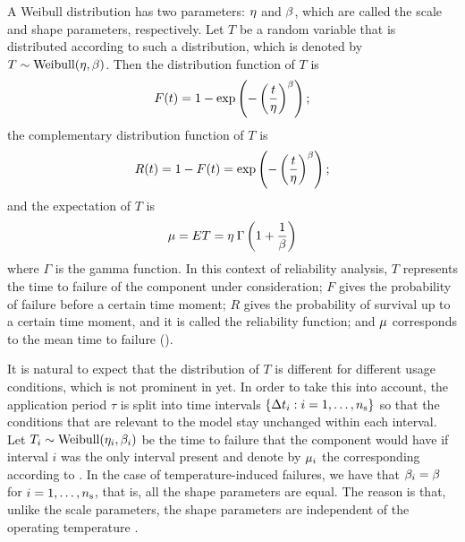 A Weibull distribution has two parameters: $\eta$ and $\beta$, which are
called the scale and shape parameters, respectively. Let $T$ be a random
variable that is distributed according to such a distribution, which is denoted
by $T \sim \mathrm{Weibull}(\eta, \beta)$. Then the distribution function
\cite{durrett2010} of $T$ is
\begin{equation} \elab{weibull-distribution}
  F(t) = 1 - \exp\left(-\left(\frac{t}{\scale}\right)^\shape\right);
\end{equation}
the complementary distribution function of $T$ is
\begin{equation} \elab{weibull-reliability}
  R(t) = 1 - F(t) = \exp\left(-\left(\frac{t}{\scale}\right)^\shape\right);
\end{equation}
and the expectation of $T$ is
\begin{equation} \elab{weibull-expectation}
  \mean = \expectation{T} = \scale \: \Gamma\left(1 + \frac{1}{\shape}\right)
\end{equation}
where $\Gamma$ is the gamma function. In this context of reliability analysis,
$T$ represents the time to failure of the component under consideration; $F$
gives the probability of failure before a certain time moment; $R$ gives the
probability of survival up to a certain time moment, and it is called the
reliability function; and $\mu$ corresponds to the mean time to failure
().

It is natural to expect that the distribution of $T$ is different for different
usage conditions, which is not prominent in  yet. In
order to take this into account, the application period $\tau$ is split into \ns
time intervals $\{ \Delta t_i: i = 1, \dots, {n_\mathrm{s}} \}$ so that the conditions that are
relevant to the model stay unchanged within each interval. Let $T_i \sim
\mathrm{Weibull}(\eta_i, \beta_i)$ be the time to failure that the component
would have if interval $i$ was the only interval present and denote by $\mu_i$
the corresponding  according to . In the case
of temperature-induced failures, we have that $\beta_i = \beta$ for $i =
1, \dots, {n_\mathrm{s}}$, that is, all the shape parameters are equal. The reason is
that, unlike the scale parameters, the shape parameters are independent of the
operating temperature \cite{chang2006}.

